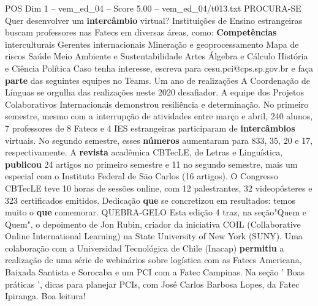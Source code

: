 \begin{textsample}{POS Dim 1 – vem\_ed\_04 – Score 5.00 – vem\_ed\_04/t013.txt}  \label{ex:f1_pos_181}
PROCURA-SE Quer desenvolver um \textbf{intercâmbio} virtual?
Instituições de Ensino estrangeiras buscam professores nas Fatecs em diversas áreas, como: \textbf{Competências} interculturais Gerentes internacionais Mineração e geoprocessamento Mapa de riscos Saúde Meio Ambiente e Sustentabilidade Artes Álgebra e Cálculo História e Ciência Política Caso tenha interesse, escreva para cesu.pci@cps.sp.gov.br e faça \textbf{parte} das seguintes equipes no Teams.
Um ano de realizações A Coordenação de Línguas se orgulha das realizações neste 2020 desafiador.
A equipe dos Projetos Colaborativos Internacionais demonstrou resiliência e determinação.
No primeiro semestre, mesmo com a interrupção de atividades entre março e abril, 240 alunos, 7 professores de 8 Fatecs e 4 IES estrangeiras participaram de \textbf{intercâmbios} virtuais.
No segundo semestre, esses \textbf{números} aumentaram para 833, 35, 20 e 17, respectivamente.
A \textbf{revista} acadêmica CBTecLE, de Letras e Linguística, \textbf{publicou} 24 artigos no primeiro semestre e 11 no segundo semestre, mais um especial com o Instituto Federal de São Carlos (16 artigos).
O Congresso CBTecLE teve 10 horas de sessões online, com 12 palestrantes, 32 videopôsteres e 323 certificados emitidos.
Dedicação \textbf{que} se concretizou em resultados: temos muito o \textbf{que} comemorar.
QUEBRA-GELO Esta edição 4 traz, na seção"Quem e Quem", o depoimento de Jon Rubin, criador da iniciativa COIL (Collaborative Online International Learning) na State University of New York (SUNY).
Uma colaboração com a Universidad Tecnológica de Chile (Inacap) \textbf{permitiu} a realização de uma série de webinários sobre logística com as Fatecs Americana, Baixada Santista e Sorocaba e um PCI com a Fatec Campinas.
Na seção ' Boas práticas ', dicas para planejar PCIs, com José Carlos Barbosa Lopes, da Fatec Ipiranga.
Boa leitura!

\end{textsample}
